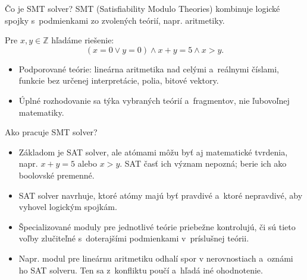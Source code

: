 \documentclass[12pt]{beamer}
\begin{document}
\begin{frame}{Čo je SMT solver?}
  \alert{SMT} (Satisfiability Modulo Theories) kombinuje logické spojky
  s~podmienkami zo zvolených teórií, napr. aritmetiky.

  Pre $x,y\in\mathbb Z$ hľadáme riešenie:
  \[
    (x=0\lor y=0)\land x+y=5\land x>y.
  \]

  \begin{itemize}
    \item Podporované teórie: lineárna aritmetika nad celými
      a~reálnymi číslami, funkcie bez určenej interpretácie,
      polia, bitové vektory.
    \item Úplné rozhodovanie sa týka vybraných teórií a~fragmentov,
      nie ľubovoľnej matematiky.
  \end{itemize}
\end{frame}



\begin{frame}{Ako pracuje SMT solver?}
  \begin{itemize}
    \item Základom je SAT solver, ale atómami môžu byť aj matematické
      tvrdenia, napr. $x+y=5$ alebo $x>y$.
      SAT časť ich význam nepozná; berie ich ako boolovské premenné.
    \item SAT solver navrhuje, ktoré atómy majú byť pravdivé
      a~ktoré nepravdivé, aby vyhovel logickým spojkám.
    \item Špecializované moduly pre jednotlivé teórie priebežne kontrolujú,
      či sú tieto voľby zlučiteľné s~doterajšími podmienkami
      v~príslušnej teórii.
    \item Napr. modul pre lineárnu aritmetiku odhalí spor
      v nerovnostiach a~oznámi ho SAT solveru.
      Ten sa z~konfliktu poučí a~hľadá iné ohodnotenie.
  \end{itemize}
\end{frame}
\end{document}
